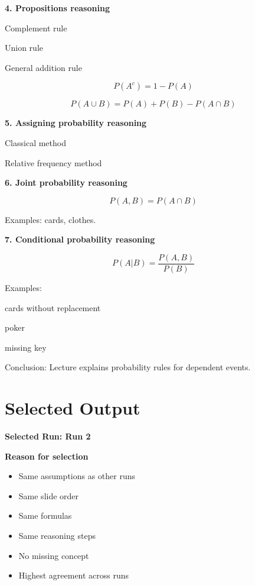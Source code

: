\documentclass[12pt]{article}
\begin{document}
\bigskip

\textbf{4. Propositions reasoning}

Complement rule

Union rule

General addition rule

\[
P(A^c)=1-P(A)
\]

\[
P(A \cup B)=P(A)+P(B)-P(A \cap B)
\]

\bigskip

\textbf{5. Assigning probability reasoning}

Classical method

Relative frequency method

\bigskip

\textbf{6. Joint probability reasoning}

\[
P(A,B)=P(A \cap B)
\]

Examples: cards, clothes.

\bigskip

\textbf{7. Conditional probability reasoning}

\[
P(A|B)=\frac{P(A,B)}{P(B)}
\]

Examples:

cards without replacement

poker

missing key

\bigskip

Conclusion: Lecture explains probability rules for dependent events.


\newpage

\section*{Selected Output}

\textbf{Selected Run: Run 2}

\bigskip

\textbf{Reason for selection}

\begin{itemize}
\item Same assumptions as other runs
\item Same slide order
\item Same formulas
\item Same reasoning steps
\item No missing concept
\item Highest agreement across runs
\end{itemize}
\end{document}
